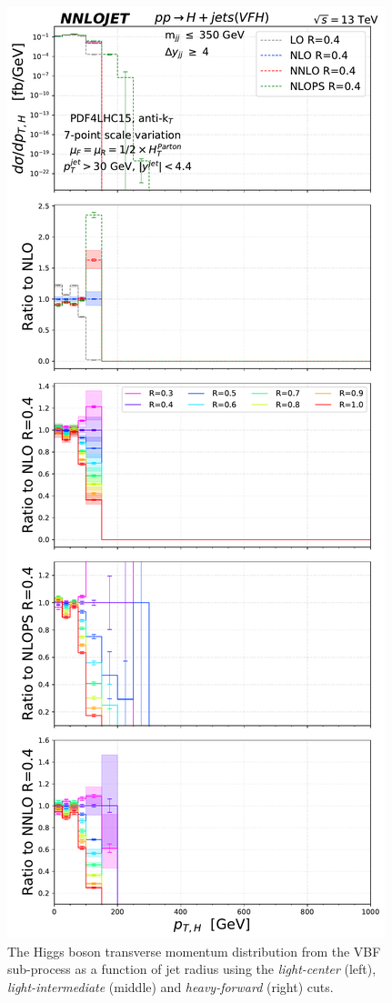 \documentclass[10pt,prd,fleqn,superscriptaddress,notitlepage,nofootinbib,preprintnumbers,nobalancelastpage]{revtex4-1}
\newcommand{\VBF}{VBF\xspace}
\begin{document}
\begin{figure}[t]
\includegraphics[scale=0.3]{figures/rdep/LH19VFH_pth_largebin_light_forward.pdf}
\caption{The Higgs boson transverse momentum distribution from the \VBF sub-process as a function of jet radius using the \textit{light-center} (left), \textit{light-intermediate} (middle) and \textit{heavy-forward} (right) cuts.}
\label{fig:fig_Higgs_pT_NNLO_large_light-center}
\end{figure}
\end{document}
